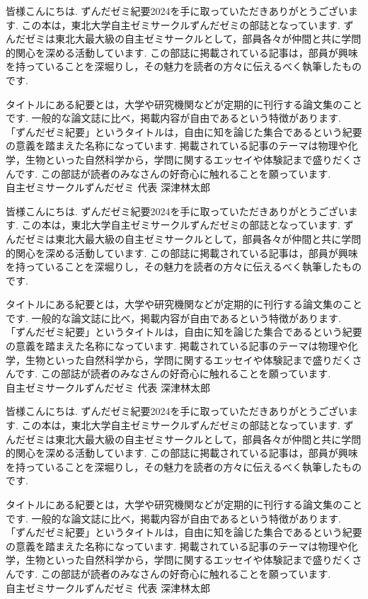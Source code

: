 
皆様こんにちは. 
ずんだゼミ紀要2024を手に取っていただきありがとうございます. 
この本は，東北大学自主ゼミサークルずんだゼミの部誌となっています. 
ずんだゼミは東北大最大級の自主ゼミサークルとして，部員各々が仲間と共に学問的関心を深める活動しています. 
この部誌に掲載されている記事は，部員が興味を持っていることを深堀りし，その魅力を読者の方々に伝えるべく執筆したものです. 

タイトルにある紀要とは，大学や研究機関などが定期的に刊行する論文集のことです. 
一般的な論文誌に比べ，掲載内容が自由であるという特徴があります. 
「ずんだゼミ紀要」というタイトルは，自由に知を論じた集合であるという紀要の意義を踏まえた名称になっています. 
掲載されている記事のテーマは物理や化学，生物といった自然科学から，学問に関するエッセイや体験記まで盛りだくさんです. 
この部誌が読者のみなさんの好奇心に触れることを願っています. \\

自主ゼミサークルずんだゼミ 代表 深津林太郎

皆様こんにちは. 
ずんだゼミ紀要2024を手に取っていただきありがとうございます. 
この本は，東北大学自主ゼミサークルずんだゼミの部誌となっています. 
ずんだゼミは東北大最大級の自主ゼミサークルとして，部員各々が仲間と共に学問的関心を深める活動しています. 
この部誌に掲載されている記事は，部員が興味を持っていることを深堀りし，その魅力を読者の方々に伝えるべく執筆したものです. 

タイトルにある紀要とは，大学や研究機関などが定期的に刊行する論文集のことです. 
一般的な論文誌に比べ，掲載内容が自由であるという特徴があります. 
「ずんだゼミ紀要」というタイトルは，自由に知を論じた集合であるという紀要の意義を踏まえた名称になっています. 
掲載されている記事のテーマは物理や化学，生物といった自然科学から，学問に関するエッセイや体験記まで盛りだくさんです. 
この部誌が読者のみなさんの好奇心に触れることを願っています. \\

自主ゼミサークルずんだゼミ 代表 深津林太郎

皆様こんにちは. 
ずんだゼミ紀要2024を手に取っていただきありがとうございます. 
この本は，東北大学自主ゼミサークルずんだゼミの部誌となっています. 
ずんだゼミは東北大最大級の自主ゼミサークルとして，部員各々が仲間と共に学問的関心を深める活動しています. 
この部誌に掲載されている記事は，部員が興味を持っていることを深堀りし，その魅力を読者の方々に伝えるべく執筆したものです. 

タイトルにある紀要とは，大学や研究機関などが定期的に刊行する論文集のことです. 
一般的な論文誌に比べ，掲載内容が自由であるという特徴があります. 
「ずんだゼミ紀要」というタイトルは，自由に知を論じた集合であるという紀要の意義を踏まえた名称になっています. 
掲載されている記事のテーマは物理や化学，生物といった自然科学から，学問に関するエッセイや体験記まで盛りだくさんです. 
この部誌が読者のみなさんの好奇心に触れることを願っています. \\

自主ゼミサークルずんだゼミ 代表 深津林太郎








